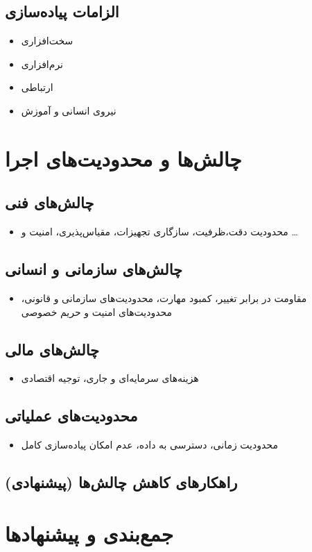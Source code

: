 \documentclass{chamranintern}
\begin{document}
\section{الزامات پیاده‌سازی}
\begin{itemize}
  \item سخت‌افزاری
  \item نرم‌افزاری
  \item ارتباطی
  \item نیروی انسانی و آموزش
\end{itemize}

\chapter{چالش‌ها و محدودیت‌های اجرا}
\section{چالش‌های فنی}
\begin{itemize}
  \item محدودیت دقت،ظرفیت، سازگاری تجهیزات، مقیاس‌پذیری، امنیت و \ldots
\end{itemize}

\section{چالش‌های سازمانی و انسانی}
\begin{itemize}
  \item مقاومت در برابر تغییر، کمبود مهارت، محدودیت‌های سازمانی و قانونی، محدودیت‌های امنیت و حریم خصوصی
\end{itemize}

\section{چالش‌های مالی}
\begin{itemize}
  \item هزینه‌های سرمایه‌ای و جاری، توجیه اقتصادی
\end{itemize}

\section{محدودیت‌های عملیاتی}
\begin{itemize}
  \item محدودیت زمانی، دسترسی به داده، عدم امکان پیاده‌سازی کامل
\end{itemize}

\section{راهکارهای کاهش چالش‌ها (پیشنهادی)}

\chapter{جمع‌بندی و پیشنهادها}



\end{document}
